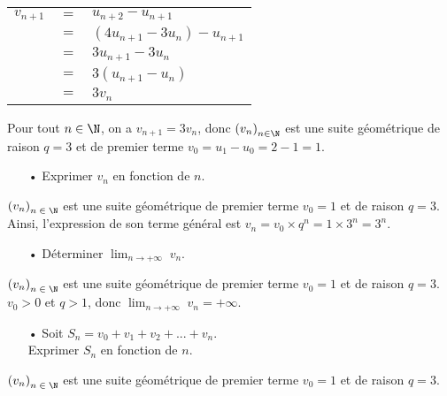 \begin{tabular}{lll}
$v_{n+1}$ & $=$ & $u_{n+2} - u_{n+1}$ \\
& $=$ & $\left(4u_{n+1} - 3u_n\right) - u_{n+1}$ \\
& $=$ & $3u_{n+1} - 3u_n$ \\
& $=$ & $3\left(u_{n+1} - u_n\right)$ \\
& $=$ & $3v_n$ \\
\end{tabular}

\vspace*{.3cm}

Pour tout $n \in \N$, on a $v_{n+1} = 3v_n$, donc $\left(v_n\right)_{n \in \N}$ est une suite géométrique de raison $q = 3$ et de premier terme $v_0 = u_1 - u_0 = 2 - 1 = 1$. \\

\begin{itemize}
\item[•] Exprimer $v_n$ en fonction de $n$. \\
\end{itemize}

$\left(v_n\right)_{n \; \in \; \N}$ est une suite géométrique de premier terme $v_0 = 1$ et de raison $q = 3$. \\

Ainsi, l'expression de son terme général est $v_n = v_0 \times q^n = 1 \times 3^n = 3^n$. \\

\begin{itemize}
\item[•] Déterminer $ \displaystyle {\lim_{n \rightarrow +\infty}} \; v_n$. \\
\end{itemize}

$\left(v_n\right)_{n \; \in \; \N}$ est une suite géométrique de premier terme $v_0 = 1$ et de raison $q = 3$. \\

$v_0 > 0$ et $q > 1$, donc $ \displaystyle {\lim_{n \rightarrow +\infty}} \; v_n = +\infty$. 

\newpage

\begin{itemize}
\item[•] Soit $S_n = v_0 + v_1 + v_2 + ... + v_n$. \\ Exprimer $S_n$ en fonction de $n$. \\
\end{itemize}

$\left(v_n\right)_{n \; \in \; \N}$ est une suite géométrique de premier terme $v_0 = 1$ et de raison $q = 3$. \\


